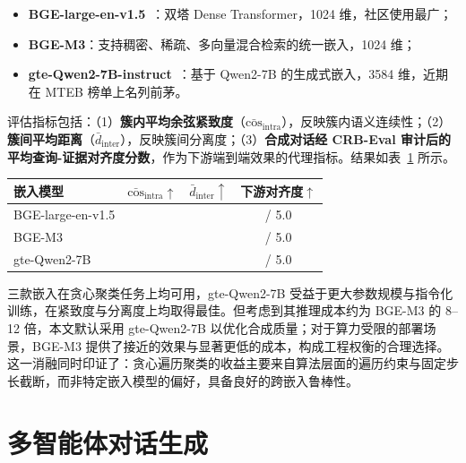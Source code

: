 \begin{itemize}
    \item \textbf{BGE-large-en-v1.5}~\citep{xiao2023cpack}：双塔 Dense Transformer，1024 维，社区使用最广；
    \item \textbf{BGE-M3}：支持稠密、稀疏、多向量混合检索的统一嵌入，1024 维；
    \item \textbf{gte-Qwen2-7B-instruct}~\citep{Zhang2024JasperAS}：基于 Qwen2-7B 的生成式嵌入，3584 维，近期在 MTEB 榜单上名列前茅。
\end{itemize}

评估指标包括：（1）\textbf{簇内平均余弦紧致度}（$\bar{\text{cos}}_{\text{intra}}$），反映簇内语义连续性；（2）\textbf{簇间平均距离}（$\bar{d}_{\text{inter}}$），反映簇间分离度；（3）\textbf{合成对话经 CRB-Eval 审计后的平均查询-证据对齐度分数}，作为下游端到端效果的代理指标。结果如表~\ref{tab:embedding_ablation} 所示。

\begin{table}[h]
\centering
{}
\label{tab:embedding_ablation}
\begin{tabular}{lccc}
\toprule
嵌入模型 & $\bar{\text{cos}}_{\text{intra}}\uparrow$ & $\bar{d}_{\text{inter}}\uparrow$ & 下游对齐度$\uparrow$ \\
\midrule
BGE-large-en-v1.5 & \TBD{} & \TBD{} & \TBD{} / 5.0 \\
BGE-M3            & \TBD{} & \TBD{} & \TBD{} / 5.0 \\
gte-Qwen2-7B      & \TBD{} & \TBD{} & \TBD{} / 5.0 \\
\bottomrule
\end{tabular}
\end{table}

三款嵌入在贪心聚类任务上均可用，gte-Qwen2-7B 受益于更大参数规模与指令化训练，在紧致度与分离度上均取得最佳。但考虑到其推理成本约为 BGE-M3 的 8--12 倍，本文默认采用 gte-Qwen2-7B 以优化合成质量；对于算力受限的部署场景，BGE-M3 提供了接近的效果与显著更低的成本，构成工程权衡的合理选择。这一消融同时印证了：贪心遍历聚类的收益主要来自算法层面的遍历约束与固定步长截断，而非特定嵌入模型的偏好，具备良好的跨嵌入鲁棒性。





\section{多智能体对话生成}

\label{sec:multi_agent_gen}



